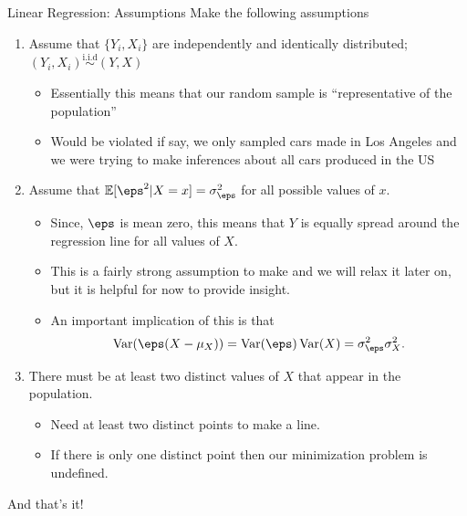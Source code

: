 \documentclass[notheorems, 9pt]{beamer}
\begin{document}
\begin{frame}{Linear Regression: Assumptions} 
	\label{frame:assm-2}
	Make the following assumptions
	\begin{enumerate}
		\item<1->  Assume that \(\{Y_i,X_i\}\) are independently and identically distributed; \((Y_i,X_i) \overset{\text{i.i.d}}{\sim} (Y,X)\)
		\begin{itemize}
			\item<1|only@1> Essentially this means that our random sample is ``representative of the population'' 
			\item<1|only@1> Would be violated if say, we only sampled cars made in Los Angeles and we were trying to make inferences about all cars produced in the US
		\end{itemize}
		\item<2->  Assume that \(\E[\eps^2|X=x]= \sigma_\eps^2 \) for all possible values of \(x\).
		\begin{itemize}
			\item<2|only@2> Since, \(\eps\) is mean zero, this means that \(Y\) is equally spread around the regression line for all values of \(X\).
			\item<2|only@2> This is a fairly strong assumption to make and we will relax it later on, but it is helpful for now to provide insight.
			\item<2->An important implication of this is that
			\[
				\Var(\eps(X-\mu_X)) = \Var(\eps)\Var(X) = \sigma_\eps^2\sigma_X^2
			.\] 
			\only<2>{\green{Questions?}}
		\end{itemize}
		\item<3->  There must be at least two distinct values of \(X\) that appear in the population.
		\begin{itemize}
			\item<3|only@3> Need at least two distinct points to make a line. 
			\item<3|only@3> If there is only one distinct point then our minimization problem is undefined.
		\end{itemize}
	\end{enumerate}
	And that's it!
\end{frame}
\end{document}
